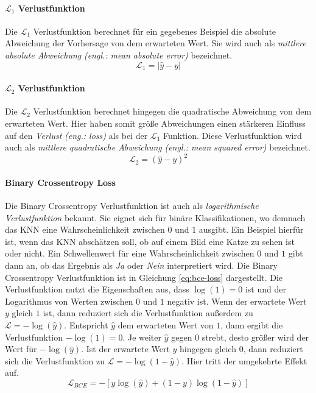 \paragraph{$\mathcal{L}_1$ Verlustfunktion} Die $\mathcal{L}_1$ Verlustfunktion berechnet für ein gegebenes Beispiel die absolute Abweichung der Vorhersage von dem erwarteten Wert. Sie wird auch als \emph{mittlere absolute Abweichung} \emph{(engl.: mean absolute error)} bezeichnet. \cite{DeepLearningBook}
\begin{equation}
   \mathcal{L}_1 = |\hat{y} - y|
\end{equation}

\paragraph{$\mathcal{L}_2$ Verlustfunktion} Die $\mathcal{L}_2$ Verlustfunktion berechnet hingegen die quadratische Abweichung von dem erwarteten Wert. Hier haben somit größe Abweichungen einen stärkeren Einfluss auf den \emph{Verlust} \emph{(eng.: loss)} als bei der $\mathcal{L}_1$ Funktion. Diese Verlustfunktion wird auch als \emph{mittlere quadratische Abweichung} \emph{(engl.: mean squared error)} bezeichnet. \cite{DeepLearningBook}
\begin{equation}
   \mathcal{L}_2 = (\hat{y} - y)^2
\end{equation}

\paragraph{Binary Crossentropy Loss} Die Binary Crossentropy Verlustfunktion ist auch als \emph{logarithmische Verlustfunktion} bekannt. Sie eignet sich für binäre Klassifikationen, wo demnach das \ac{KNN} eine Wahrscheinlichkeit zwischen $0$ und $1$ ausgibt. Ein Beispiel hierfür ist, wenn das \ac{KNN} abschätzen soll, ob auf einem Bild eine Katze zu sehen ist oder nicht. Ein Schwellenwert für eine Wahrscheinlichkeit zwischen $0$ und $1$ gibt dann an, ob das Ergebnis als \emph{Ja} oder \emph{Nein} interpretiert wird. Die Binary Crossentropy Verlustfunktion ist in Gleichung \ref{eq:bce-loss} dargestellt. Die Verlustfunktion nutzt die Eigenschaften aus, dass $\log(1) = 0$ ist und der Logarithmus von Werten zwischen $0$ und $1$ negativ ist. Wenn der erwartete Wert $y$ gleich $1$ ist, dann reduziert sich die Verlustfunktion außerdem zu $\mathcal{L} = -\log(\hat{y})$. Entspricht $\hat{y}$ dem erwarteten Wert von $1$, dann ergibt die Verlustfunktion $-\log(1)=0$. Je weiter $\hat{y}$ gegen $0$ strebt, desto größer wird der Wert für $-\log(\hat{y})$. Ist der erwartete Wert $y$ hingegen gleich $0$, dann reduziert sich die Verlustfunktion zu $\mathcal{L} = -\log(1 - \hat{y})$. Hier tritt der umgekehrte Effekt auf. \cite{bce-loss}
\begin{equation}
	\label{eq:bce-loss}
   \mathcal{L}_{BCE} =  - [y \log(\hat{y}) + (1 - y) \log(1 - \hat{y})]
\end{equation}


